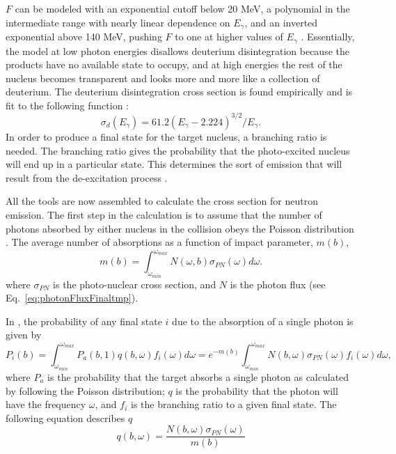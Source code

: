     $F$ can be modeled with an exponential cutoff below 20 MeV, a polynomial in 
      the intermediate range with nearly linear dependence on $E_{\gamma}$, and 
      an inverted exponential above 140 MeV, pushing $F$ to one at higher 
      values of $E_{\gamma}$ \cite{emPCite4}.
    Essentially, the model at low photon energies disallows deuterium 
      disintegration because the products have no available state to occupy, 
      and at high energies the rest of the nucleus becomes transparent and 
      looks more and more like a collection of deuterium.
    The deuterium disintegration cross section is found empirically and is fit 
      to the following function \cite{emPCite4}:
    \begin{equation}
      \sigma_{d}(E_{\gamma})=61.2\left(E_{\gamma}-2.224\right)^{3/2}/E_{\gamma}.
      \label{eq:deDisSigma}
    \end{equation}
    In order to produce a final state for the target nucleus, a branching ratio
      is needed.
    The branching ratio gives the probability that the photo-excited nucleus 
      will end up in a particular state.
    This determines the sort of emission that will result from the 
      de-excitation process \cite{emPCite4}.

    All the tools are now assembled to calculate the cross section for neutron
      emission.
    The first step in the calculation is to assume that the number of photons 
      absorbed by either nucleus in the collision obeys the Poisson 
      distribution \cite{emPCite3,emPCite4}.
    The average number of absorptions as a function of impact parameter, $m(b)$,
      \begin{equation}
        m(b)=\int^{\omega_{max}}_{\omega_{min}}N(\omega,b)\sigma_{PN}(\omega)d\omega\textrm{.}
        \label{eq:meanOfSigma}
      \end{equation}
      where $\sigma_{PN}$ is the photo-nuclear cross section, and $N$ is the 
      photon flux (see Eq.~\ref{eq:photonFluxFinaltmp}).

   In \cite{emPCite4}, the probability of any final state $i$ due to the 
      absorption of a single photon is given by
    \begin{equation}
      P_{i}(b)=\int^{\omega_{max}}_{\omega_{min}}P_{a}(b,1)q(b,\omega)f_{i}(\omega)d\omega=
      e^{-m(b)}\int^{\omega_{max}}_{\omega_{min}}N(b,\omega)\sigma_{PN}(\omega)f_{i}(\omega)d\omega,
      \label{eq:photonProi}
    \end{equation}
    where $P_{a}$ is the probability that the target absorbs a single photon as 
      calculated by following the Poisson distribution; $q$ is the probability 
      that the photon will have the frequency $\omega$, and $f_{i}$ is the 
      branching ratio to a given final state.
    The following equation describes $q$ \cite{emPCite5}
    \begin{equation}
      q(b,\omega)=\frac{N(b,\omega)\sigma_{PN}(\omega)}{m(b)}
      \label{eq:freqProb}
    \end{equation}
    
